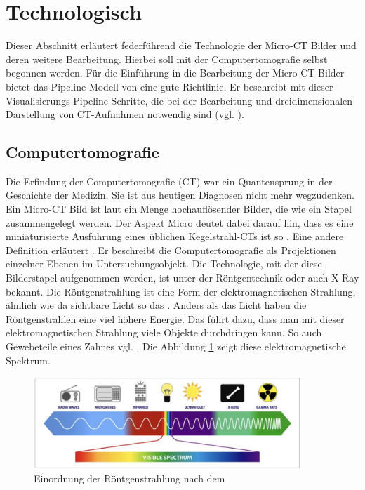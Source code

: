 \section{Technologisch}
\label{sec:technologisch} Dieser Abschnitt erläutert federführend die Technologie
der Micro-CT Bilder und deren weitere Bearbeitung. Hierbei soll mit der
Computertomografie selbst begonnen werden. Für die Einführung in die Bearbeitung
der Micro-CT Bilder bietet das Pipeline-Modell von \citet[Seite 50]{handels2000}
eine gute Richtlinie. Er beschreibt mit dieser Visualisierungs-Pipeline Schritte,
die bei der Bearbeitung und dreidimensionalen Darstellung von CT-Aufnahmen notwendig
sind (vgl. \citep[Seite 50]{handels2000}).

\subsection{Computertomografie}
\label{subsec:computertomografie} Die Erfindung der Computertomografie (CT) war
ein Quantensprung in der Geschichte der Medizin. Sie ist aus heutigen Diagnosen nicht
mehr wegzudenken. Ein Micro-CT Bild ist laut \citet[Abstract]{baird2017} ein
Menge hochauflösender Bilder, die wie ein Stapel zusammengelegt werden. Der
Aspekt Micro deutet dabei darauf hin, dass es eine miniaturisierte Ausführung eines
üblichen Kegelstrahl-CTs ist so \citet[Seite 340]{buzug2011}. Eine andere
Definition erläutert \citet{lehmann2013bildverarbeitung}. Er beschreibt die
Computertomografie als Projektionen einzelner Ebenen im Untersuchungsobjekt. Die
Technologie, mit der diese Bilderstapel aufgenommen werden, ist unter der Röntgentechnik
oder auch X-Ray bekannt. Die Röntgenstrahlung ist eine Form der
elektromagnetischen Strahlung, ähnlich wie da sichtbare Licht so das \citet{nib2024}.
Anders als das Licht haben die Röntgenstrahlen eine viel höhere Energie. Das
führt dazu, dass man mit dieser elektromagnetischen Strahlung viele Objekte durchdringen
kann. So auch Gewebeteile eines Zahnes vgl. \citep{nib2024}. Die Abbildung \ref{fig:spectrum}
zeigt diese elektromagnetische Spektrum.

\begin{figure}[h]
	\centering
	\includegraphics[width=0.9\textwidth]{img/spectrum.jpg}
	\caption{Einordnung der Röntgenstrahlung nach dem \citet{nib2024}}
	\label{fig:spectrum}
\end{figure}

